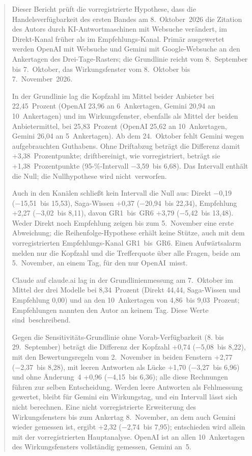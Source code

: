 \documentclass[11pt]{article}
\begin{document}
\begin{abstract}
Dieser Bericht prüft die vorregistrierte Hypothese, dass die Handelsverfügbarkeit des ersten Bandes am 8.~Oktober~2026 die Zitation des Autors durch KI-Antwortmaschinen mit Websuche verändert, im Direkt-Kanal früher als im Empfehlungs-Kanal. Primär ausgewertet werden OpenAI mit Websuche und Gemini mit Google-Websuche an den Ankertagen des Drei-Tage-Rasters; die Grundlinie reicht vom 8.~September bis 7.~Oktober, das Wirkungsfenster vom 8.~Oktober bis 7.~November~2026.

In der Grundlinie lag die Kopfzahl im Mittel beider Anbieter bei 22,45~Prozent (OpenAI 23,96 an 6~Ankertagen, Gemini 20,94 an 10~Ankertagen) und im Wirkungsfenster, ebenfalls als Mittel der beiden Anbietermittel, bei 25,83~Prozent (OpenAI 25,62 an 10~Ankertagen, Gemini 26,04 an 5~Ankertagen). Ab dem 24.~Oktober fehlt Gemini wegen aufgebrauchten Guthabens. Ohne Driftabzug beträgt die Differenz damit +3,38~Prozentpunkte; driftbereinigt, wie vorregistriert, beträgt sie +1,38~Prozentpunkte (95-\%-Intervall −3,59~bis 6,68). Das Intervall enthält die Null; die Nullhypothese wird nicht~\mbox{verworfen.}

Auch in den Kanälen schließt kein Intervall die Null aus: Direkt −0,19 (−15,51~bis 15,53), Saga-Wissen +0,37 (−20,94~bis 22,34), Empfehlung +2,27 (−3,02~bis 8,11), davon GR1~bis~GR6 +3,79 (−5,42~bis 13,48). Weder Direkt noch Empfehlung zeigen bis zum 5.~November eine erste Abweichung; die Reihenfolge-Hypothese erhält keine Stütze, auch mit dem vorregistrierten Empfehlungs-Kanal GR1~bis~GR6. Einen Aufwärtsalarm melden nur die Kopfzahl und die Trefferquote über alle Fragen, beide am 5.~November, an einem Tag, für den nur OpenAI~\mbox{misst.}

Claude auf claude.ai lag in der Grundlinienmessung am 7.~Oktober im Mittel der drei Modelle bei 8,34~Prozent (Direkt 44,44, Saga-Wissen und Empfehlung 0,00) und an den 10~Ankertagen von 4,86~bis 9,03~Prozent; Empfehlungen nannten den Autor an keinem Tag. Diese Werte sind~\mbox{beschreibend.}

Gegen die Sensitivitäts-Grundlinie ohne Vorab-Verfügbarkeit (8. bis 29.~September) beträgt die Differenz der Kopfzahl +0,74 (−5,08~bis 8,22), mit den Bewertungsregeln vom 2.~November in beiden Fenstern +2,77 (−2,37~bis 8,28), mit leeren Antworten als Lücke +1,70 (−3,27~bis 6,96) und ohne Änderung~4 +0,96 (−4,15~bis 6,36); alle diese Rechnungen führen zur selben Entscheidung. Werden leere Antworten als Fehlmessung gewertet, bleibt für Gemini ein Wirkungstag, und ein Intervall lässt sich nicht berechnen. Eine nicht vorregistrierte Erweiterung des Wirkungsfensters bis zum Ankertag 8.~November, an dem auch Gemini wieder gemessen ist, ergibt +2,32 (−2,74~bis 7,95); entschieden wird allein mit der vorregistrierten Hauptanalyse. OpenAI ist an allen 10~Ankertagen des Wirkungsfensters vollständig gemessen, Gemini an~\mbox{5.}

\end{abstract}
\end{document}
